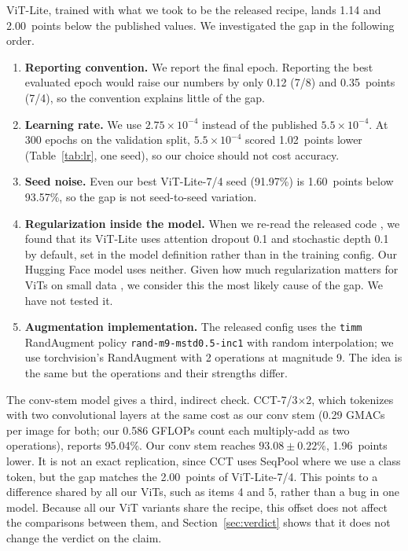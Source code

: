 \documentclass[11pt]{article}
\begin{document}
ViT-Lite, trained with what we took to be the released recipe, lands 1.14 and 2.00~points below the published values. We investigated the gap in the following order.

\begin{enumerate}[leftmargin=*]
\item \textbf{Reporting convention.} We report the final epoch. Reporting the best evaluated epoch would raise our numbers by only 0.12 (7/8) and 0.35~points (7/4), so the convention explains little of the gap.
\item \textbf{Learning rate.} We use $2.75\times10^{-4}$ instead of the published $5.5\times10^{-4}$. At 300 epochs on the validation split, $5.5\times10^{-4}$ scored 1.02~points lower (Table~\ref{tab:lr}, one seed), so our choice should not cost accuracy.
\item \textbf{Seed noise.} Even our best ViT-Lite-7/4 seed (91.97\%) is 1.60~points below 93.57\%, so the gap is not seed-to-seed variation.
\item \textbf{Regularization inside the model.} When we re-read the released code \citep{cctrepo}, we found that its ViT-Lite uses attention dropout 0.1 and stochastic depth 0.1 by default, set in the model definition rather than in the training config. Our Hugging Face model uses neither. Given how much regularization matters for ViTs on small data \citep{steiner2022augreg}, we consider this the most likely cause of the gap. We have not tested it.
\item \textbf{Augmentation implementation.} The released config uses the \texttt{timm} RandAugment policy \texttt{rand-m9-}\allowbreak\texttt{mstd0.5-inc1} with random interpolation; we use torchvision's RandAugment with 2 operations at magnitude 9. The idea is the same but the operations and their strengths differ.
\end{enumerate}

\noindent The conv-stem model gives a third, indirect check. CCT-7/3$\times$2, which tokenizes with two convolutional layers at the same cost as our conv stem (0.29 GMACs per image for both; our 0.586 GFLOPs count each multiply-add as two operations), reports 95.04\%. Our conv stem reaches $93.08 \pm 0.22\%$, 1.96~points lower. It is not an exact replication, since CCT uses SeqPool where we use a class token, but the gap matches the 2.00~points of ViT-Lite-7/4. This points to a difference shared by all our ViTs, such as items 4 and 5, rather than a bug in one model. Because all our ViT variants share the recipe, this offset does not affect the comparisons between them, and Section~\ref{sec:verdict} shows that it does not change the verdict on the claim.
\end{document}
